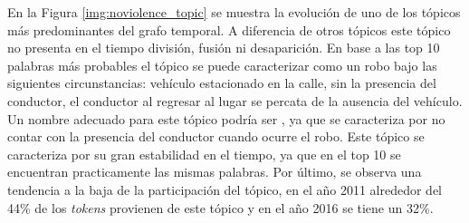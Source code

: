 En la Figura \ref{img:noviolence_topic} se muestra la evolución de uno de los tópicos más predominantes del grafo temporal. A diferencia de otros tópicos este tópico no presenta en el tiempo división, fusión ni desaparición. En base a las top 10 palabras más probables el tópico se puede caracterizar como un robo bajo las siguientes circunstancias: vehículo estacionado en la calle, sin la presencia del conductor, el conductor al regresar al lugar se percata de la ausencia del vehículo. Un nombre adecuado para este tópico podría ser , ya que se caracteriza por no contar con la presencia del conductor cuando ocurre el robo. Este tópico se caracteriza por su gran estabilidad en el tiempo, ya que en el top 10 se encuentran practicamente las mismas palabras. Por último, se observa una tendencia a la baja de la participación del tópico, en el año 2011 alrededor del 44\% de los \textit{tokens} provienen de este tópico y en el año 2016 se tiene un 32\%.

\def\topic[#1,#2,#3,#4,#5,#6]#7{
        \node[fill=#1, rounded corners, minimum height=#2, minimum width=#3, text width=4em] (#5) at #6 {}; 
        \node[anchor=#4,inner sep=2pt,] at (#5.#4)  {#7};
}
\def\tedge[#1,#2,#3,#4,#5];{ 
  \definecolor{color0}{RGB}{153,153,153}
  \draw[color=color0,#4,fill=white, line width=4*#5pt] (#1) -- #3
  (#2);  
}


